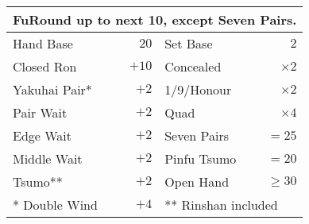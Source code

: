 \begin{tabularx}{\linewidth}{|Xr|Xr|}
  \hline
  \multicolumn{4}{|l|}{\textbf{\large Fu}\hfill Round up to next 10, except Seven Pairs.}\\
  \hline
  Hand Base & $20$ & Set Base & $2$ \\
  Closed Ron & $+10$ & Concealed & $\times 2$\\
  Yakuhai Pair* & $+2$ & 1/9/Honour & $\times 2$\\
  Pair Wait & $+2$ & Quad & $\times 4$\\
  \cmidrule{3-4}
  Edge Wait & $+2$ & Seven Pairs & $=25$\\
  Middle Wait & $+2$ & Pinfu Tsumo & $=20$\\
  Tsumo** & $+2$ & Open Hand & $\ge 30$\\
  \cmidrule{3-4}
  * Double Wind & $+4$ & \multicolumn{2}{l|}{** Rinshan included}\\
  \hline
\end{tabularx}
